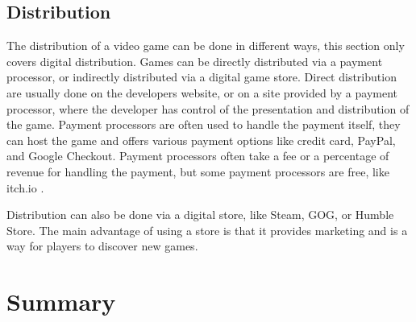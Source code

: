 \subsection{Distribution}
The distribution of a video game can be done in different ways, this section only covers digital distribution. Games can be directly distributed via a payment processor, or indirectly distributed via a digital game store. Direct distribution are usually done on the developers website, or on a site provided by a payment processor, where the developer has control of the presentation and distribution of the game. Payment processors are often used to handle the payment itself, they can host the game and offers various payment options like credit card, PayPal, and Google Checkout. Payment processors often take a fee or a percentage of revenue for handling the payment, but some payment processors are free, like itch.io \cite{itchio2016payment}.

Distribution can also be done via a digital store, like Steam, GOG, or Humble Store. The main advantage of using a store is that it provides marketing and is a way for players to discover new games.

\section{Summary}
